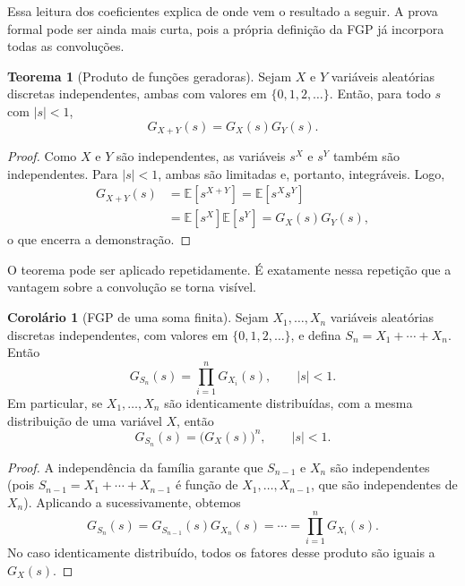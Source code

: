 \documentclass[12pt,portuguese]{article}
\theoremstyle{definition}
\newtheorem{theorem}{Teorema}
\newtheorem{corollary}[corollary]{Corolário}
\theoremstyle{plainexercise}
\theoremstyle{starredexercise}
\theoremstyle{definition}
\begin{document}
Essa leitura dos coeficientes explica de onde vem o resultado a seguir.
A prova formal pode ser ainda mais curta,
pois a própria definição da FGP já incorpora todas as convoluções.

\begin{theorem}[Produto de funções geradoras]\label{thm:produto-funcoes}
Sejam $X$ e $Y$ variáveis aleatórias discretas independentes,
ambas com valores em $\{0,1,2,\ldots\}$.
Então, para todo $s$ com $|s|<1$,
\[
G_{X+Y}(s)=G_X(s)G_Y(s).
\]
\end{theorem}

\begin{proof}
Como $X$ e $Y$ são independentes,
as variáveis $s^X$ e $s^Y$ também são independentes.
Para $|s|<1$, ambas são limitadas e, portanto, integráveis.
Logo,
\begin{align*}
G_{X+Y}(s)
&=\mathbb{E}[s^{X+Y}]
=\mathbb{E}[s^Xs^Y]
\\[0.2cm]
&=\mathbb{E}[s^X]\mathbb{E}[s^Y]
=G_X(s)G_Y(s),
\end{align*}
o que encerra a demonstração.
\end{proof}

O teorema pode ser aplicado repetidamente.
É exatamente nessa repetição que a vantagem sobre a convolução se torna
visível.

\begin{corollary}[FGP de uma soma finita]\label{cor:fgp-soma-finita}
Sejam $X_1,\ldots,X_n$ variáveis aleatórias discretas independentes,
com valores em $\{0,1,2,\ldots\}$, e defina
$S_n=X_1+\cdots+X_n$.
Então
\[
G_{S_n}(s)
=
\prod_{i=1}^{n}G_{X_i}(s),
\qquad |s|<1.
\]
Em particular, se $X_1,\ldots,X_n$ são identicamente distribuídas,
com a mesma distribuição de uma variável $X$, então
\[
G_{S_n}(s)=\bigl(G_X(s)\bigr)^n,
\qquad |s|<1.
\]
\end{corollary}

\begin{proof}
A independência da família garante que
$S_{n-1}$ e $X_n$ são independentes
(pois $S_{n-1}=X_1+\cdots+X_{n-1}$ é função de $X_1,\ldots,X_{n-1}$,
que são independentes de $X_n$).
Aplicando a  sucessivamente, obtemos
\[
G_{S_n}(s)
=G_{S_{n-1}}(s)G_{X_n}(s)
=\cdots
=\prod_{i=1}^{n}G_{X_i}(s).
\]
No caso identicamente distribuído,
todos os fatores desse produto são iguais a $G_X(s)$.
\end{proof}
\end{document}
